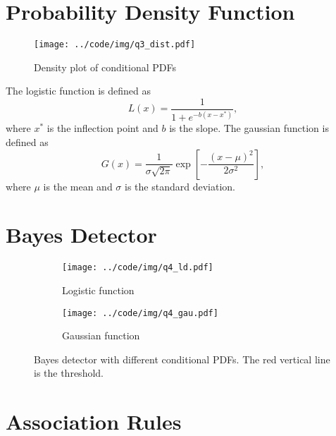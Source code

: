 \documentclass[runningheads]{llncs}
\begin{document}
\section{Probability Density Function}\label{sec:3}


\begin{figure}[!htb]
    \begin{center}
        \texttt{[image: ../code/img/q3\_dist.pdf]}
    \end{center}
    \caption{Density plot of conditional PDFs}
    \label{fig:q3}
\end{figure}

The logistic function is defined as
\begin{equation}
    L(x)=\frac{1}{1+e^{-b(x-x^*)}},
\end{equation}
where $x^*$ is the inflection point and $b$ is the slope. The gaussian function is defined as
\begin{equation}
    G(x)=\frac{1}{\sigma \sqrt{2 \pi}} \exp \left[-\frac{(x-\mu)^{2}}{2 \sigma^{2}}\right],
\end{equation}
where $\mu$ is the mean and $\sigma$ is the standard deviation.




\section{Bayes Detector}\label{sec:4}


\begin{figure}[!htbp]
    \begin{subfigure}[t]{0.49\textwidth}
        \centering
        \texttt{[image: ../code/img/q4\_ld.pdf]}
        \caption{Logistic function}
    \end{subfigure}
    \begin{subfigure}[t]{0.49\textwidth}
        \centering
        \texttt{[image: ../code/img/q4\_gau.pdf]}
        \caption{Gaussian function}
    \end{subfigure}
    \caption{Bayes detector with different conditional PDFs. The red vertical line is the threshold.}
    \label{fig:q4}
\end{figure}


\section{Association Rules}\label{sec:5}
\end{document}
